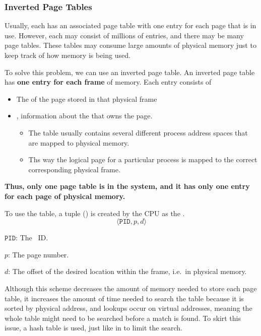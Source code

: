 \subsubsection{Inverted Page Tables}\label{subsubsec:Inverted_Page_Tables}
Usually, each  has an associated page table with one entry for each page that is in use.
However, each  may consist of millions of entries, and there may be many page tables.
These tables may consume large amounts of physical memory just to keep track of how memory is being used.

To solve this problem, we can use an inverted page table.
An inverted page table has \textbf{one entry for each frame} of memory.
Each entry consists of
\begin{itemize}[noitemsep]
\item The  of the page stored in that physical frame
\item {}, information about the  that owns the page.
  \begin{itemize}[noitemsep]
  \item The table usually contains several different process address spaces that are mapped to physical memory.
  \item Ths way the logical page for a particular process is mapped to the correct corresponding physical frame.
  \end{itemize}
\end{itemize}

\begin{blackbox}
  {\large{\textbf{Thus, only one page table is in the system, and it has only one entry for each page of physical memory.}}}
\end{blackbox}

To use the table, a tuple () is created by the CPU as the .
\begin{equation}\label{eq:Inverted_Hash_Table_Tuple}
  \langle \mathtt{PID}, p, d \rangle
\end{equation}
\begin{description}[noitemsep]
\item $\mathtt{PID}$: The ~ID.\@
\item $p$: The page number.
\item $d$: The offset of the desired location within the frame, i.e.\ in physical memory.
\end{description}

Although this scheme decreases the amount of memory needed to store each page table, it increases the amount of time needed to search the table because it is sorted by physical address, and lookups occur on virtual addresses, meaning the whole table might need to be searched before a match is found.
To skirt this issue, a hash table is used, just like in  to limit the search.

